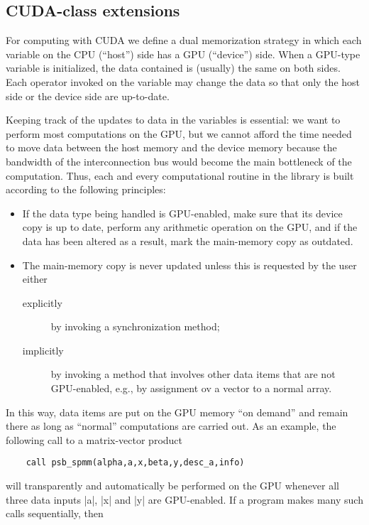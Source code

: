 
\subsection{CUDA-class extensions}

For computing  with CUDA we define a dual memorization strategy in
which each variable on the CPU (``host'') side has a GPU (``device'')
side. When a GPU-type variable is initialized, the data contained is
(usually) the same on both sides. Each operator invoked on the
variable may change the data so that only the host side or the device
side are up-to-date. 

Keeping track of the updates to data in the variables  is essential: we want
to perform most  computations on the GPU, but we cannot afford the time
needed to move data between the host  memory and the device memory
because the bandwidth of the interconnection bus would become the main
bottleneck of the computation. Thus, each and every computational
routine in the library is built according to the following principles: 
\begin{itemize}
\item If the data type being handled is {GPU}-enabled, make sure that
  its device copy is up to date, perform any arithmetic operation on
  the {GPU}, and if the data has been altered as a result, mark
  the main-memory copy as outdated.
\item The main-memory copy is never updated unless this is requested
  by the user either 
\begin{description}
\item[explicitly] by invoking a synchronization method;
\item[implicitly] by invoking a method that involves other data items
  that are not {GPU}-enabled, e.g., by assignment ov a vector to a
  normal array. 
\end{description}
\end{itemize}
In this way, data items are put on the {GPU} memory ``on demand'' and
remain there as long as ``normal'' computations are carried out. 
As an example, the following call to a matrix-vector product
\begin{verbatim}
    call psb_spmm(alpha,a,x,beta,y,desc_a,info)
\end{verbatim}
will transparently and automatically be performed on the {GPU} whenever
all three data inputs \fortinline|a|, \fortinline|x|  and
\fortinline|y| are {GPU}-enabled. If a program makes many such calls
sequentially, then 
